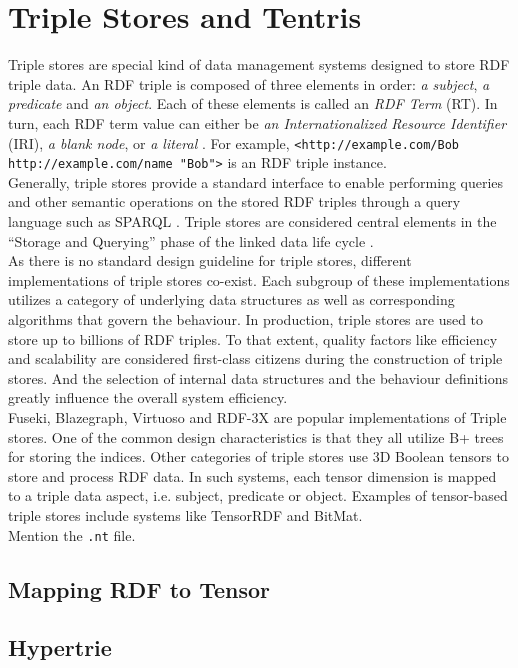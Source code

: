 \section{Triple Stores and Tentris }
\label{sec:preliminaries:tentris}

\setlength{\parindent}{4ex}Triple stores are special kind of data management systems designed to store RDF triple data. An RDF triple is composed of three elements in order: \textit{a subject}, \textit{a predicate} and \textit{an object}. Each of these elements is called an \textit{RDF Term}  (RT). 
In turn, each RDF term value can either be \textit{an Internationalized Resource Identifier} (IRI), \textit{a blank node}, or \textit{a literal} \cite{RDF11}. 
For example, \verb|<http://example.com/Bob http://example.com/name "Bob">| is an RDF triple instance. \\

Generally, triple stores provide a standard interface to enable performing queries and other semantic operations on the stored RDF triples through a query language such as SPARQL \cite{Hitzler}. 
Triple stores are considered central elements in the “Storage and Querying” phase of the linked data life cycle \cite{LOD}.  \\

As there is no standard design guideline for triple stores, different implementations of triple stores co-exist. Each subgroup of these implementations utilizes a category of underlying data structures as well as corresponding algorithms that govern the behaviour. 
In production, triple stores are used to store up to billions of RDF triples. 
To that extent, quality factors like efficiency and scalability are considered first-class citizens during the construction of triple stores. 
And the selection of internal data structures and the behaviour definitions greatly influence the overall system efficiency. \\

Fuseki, Blazegraph, Virtuoso and RDF-3X are popular implementations of Triple stores. 
One of the common design characteristics is that they all utilize B+ trees for storing the indices. 
Other categories of triple stores use 3D Boolean tensors to store and process RDF data. In such systems, each tensor dimension is mapped to a triple data aspect, i.e. subject, predicate or object. Examples of tensor-based triple stores include systems like TensorRDF and BitMat. \\

Mention the \verb|.nt| file.

\subsection{Mapping RDF to Tensor}

\subsection{Hypertrie}